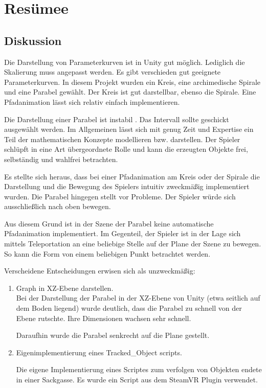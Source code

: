 
\chapter{Resümee}
\label{Resümee}

\section{Diskussion}
Die Darstellung von Parameterkurven ist in Unity gut möglich. Lediglich die Skalierung muss angepasst werden. Es gibt verschieden gut geeignete Parameterkurven. In diesem Projekt wurden ein Kreis, eine archimedische Spirale und eine Parabel gewählt.
Der Kreis ist gut darstellbar, ebenso die Spirale. Eine Pfadanimation lässt sich relativ einfach implementieren. 

Die Darstellung einer Parabel ist \glqq instabil \grqq{}. Das Intervall sollte geschickt ausgewählt werden. 
Im Allgemeinen lässt sich mit genug Zeit und Expertise ein Teil der mathematischen Konzepte modellieren bzw. darstellen. Der Spieler schlüpft in eine Art übergeordnete Rolle und kann die erzeugten Objekte frei, selbständig und wahlfrei betrachten.

Es stellte sich heraus, dass bei einer Pfadanimation am Kreis oder der Spirale die Darstellung und die Bewegung des Spielers intuitiv zweckmäßig implementiert wurden. 
Die Parabel hingegen stellt vor Probleme. Der Spieler würde sich ausschließlich nach oben bewegen.

Aus diesem Grund ist in der Szene der Parabel keine automatische Pfadanimation implementiert. Im Gegenteil, der Spieler ist in der Lage sich mittels Teleportation an eine beliebige Stelle auf der Plane der Szene zu bewegen. So kann die Form von einem beliebigen Punkt betrachtet werden.

Verscheidene Entscheidungen erwisen sich als unzweckmäßig:
\begin{enumerate}
	\item Graph in XZ-Ebene darstellen. \\
			Bei der Darstellung der Parabel in der XZ-Ebene von Unity (\glqq etwa seitlich auf dem Boden liegend\grqq{}) wurde deutlich, dass die Parabel zu schnell von der Ebene rutschte. Ihre Dimensionen wachsen sehr schnell. 
		
			Daraufhin wurde die Parabel senkrecht auf die Plane gestellt.
	\item Eigenimplementierung eines Tracked\_Object scripts. 
	
	Die eigene Implementierung eines Scriptes zum verfolgen von Objekten endete in einer Sackgasse.
	Es wurde ein Script aus dem SteamVR Plugin verwendet.
\end{enumerate} 



